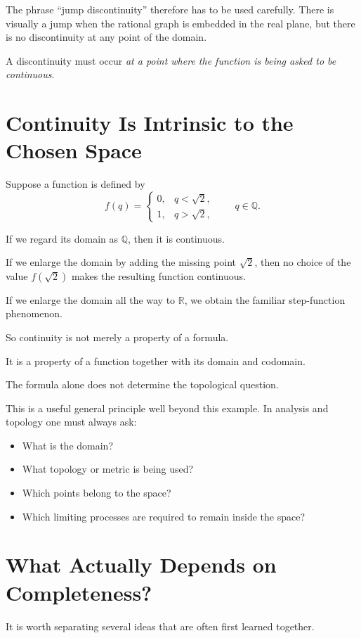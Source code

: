 \documentclass{essay}
\begin{document}
The phrase ``jump discontinuity'' therefore has to be used carefully.
There is visually a jump when the rational graph is embedded in the real
plane, but there is no discontinuity at any point of the domain.

A discontinuity must occur \emph{at a point where the function is being asked
to be continuous}.

\section{Continuity Is Intrinsic to the Chosen Space}

Suppose a function is defined by
\[
f(q)=
\begin{cases}
0,&q<\sqrt{2},\\
1,&q>\sqrt{2},
\end{cases}
\qquad q\in\mathbb{Q}.
\]

If we regard its domain as \(\mathbb{Q}\), then it is continuous.

If we enlarge the domain by adding the missing point \(\sqrt{2}\), then no
choice of the value \(f(\sqrt{2})\) makes the resulting function continuous.

If we enlarge the domain all the way to \(\mathbb{R}\), we obtain the familiar
step-function phenomenon.

So continuity is not merely a property of a formula.

It is a property of a function together with its domain and codomain.

The formula alone does not determine the topological question.

This is a useful general principle well beyond this example. In analysis and
topology one must always ask:

\begin{itemize}
    \item What is the domain?
    \item What topology or metric is being used?
    \item Which points belong to the space?
    \item Which limiting processes are required to remain inside the space?
\end{itemize}

\section{What Actually Depends on Completeness?}

It is worth separating several ideas that are often first learned together.
\end{document}
